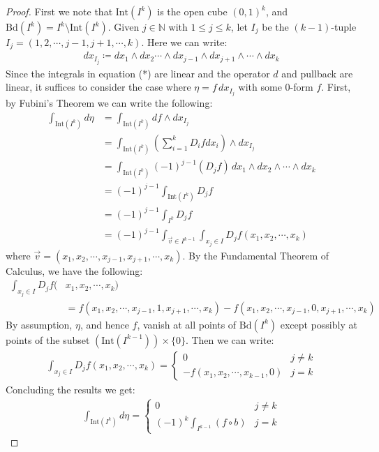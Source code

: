 \documentclass[15pt]{book}
\theoremstyle{break}
\theoremstyle{break}
\newcommand{\N}{\mathbb{N}}
\newcommand{\Int}{\text{Int}}
\newcommand{\Bd}{\text{Bd}}
\begin{document}
\begin{proof}
First we note that $\Int(I^k)$ is the open cube $(0,1)^k$, and $\Bd(I^k) = I^k \setminus \Int(I^k)$. Given $j \in \N$ with $1\leq j \leq k$, let $I_j$ be the $(k-1)$-tuple $I_j=(1,2,\cdots, j-1, j+1, \cdots, k)$. Here we can write:
\begin{align*}
dx_{I_j} \coloneqq dx_1 \wedge dx_2 \cdots \wedge dx_{j-1}\wedge dx_{j+1}\wedge \cdots \wedge dx_k
\end{align*}
Since the integrals in equation (*) are linear and the operator $d$ and pullback are linear, it suffices to consider the case where $\eta = f\, dx_{I_{j}}$ with some $0$-form $f$. First, by Fubini's Theorem we can write the following:
\begin{align*}
\int_{\Int(I^k)} d\eta 
&= \int_{\Int(I^k)} df \wedge dx_{I_j} \\
&= \int_{\Int(I^k)} \left( \sum_{i=1}^k D_i fdx_i\right) \wedge dx_{I_j}\\
&= \int_{\Int(I^k)} (-1)^{j-1}(D_j f)\, dx_1 \wedge dx_2 \wedge \cdots \wedge dx_k\\
&= (-1)^{j-1}\int_{\Int(I^k)} D_j f\\
&= (-1)^{j-1}\int_{I^k} D_j f\\
&= (-1)^{j-1}\int_{\vec{v}\in I^{k-1}}\int_{x_j \in I} D_j f(x_1, x_2,\cdots, x_k)
\end{align*}
where $\vec{v} = (x_1,x_2,\cdots, x_{j-1}, x_{j+1}, \cdots, x_k)$. By the Fundamental Theorem of Calculus, we have the following:
\begin{align*}
\int_{x_j \in I} D_j f(&x_1, x_2,\cdots, x_k)\\ 
&= f(x_1,x_2,\cdots, x_{j-1}, 1, x_{j+1}, \cdots, x_k) - f(x_1,x_2,\cdots, x_{j-1}, 0, x_{j+1}, \cdots, x_k)
\end{align*}
By assumption, $\eta$, and hence $f$, vanish at all points of $\Bd(I^k)$ except possibly at points of the subset $(\Int(I^{k-1}))\times \{0\}$. Then we can write:
\begin{align*}
\int_{x_j \in I} D_j f(x_1, x_2,\cdots, x_k)  = \begin{cases}
0 & j \neq k\\
-f(x_1,x_2,\cdots, x_{k-1}, 0) & j=k
\end{cases}
\end{align*}
Concluding the results we get:
\begin{align*}
\int_{\Int(I^k)} d\eta  = 
\begin{cases} 0  & j\neq k\\
(-1)^k \int_{I^{k-1}}(f\circ b) & j=k

\end{cases}
\end{align*}
\end{proof}
\end{document}
